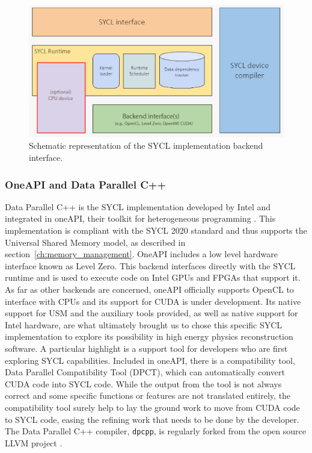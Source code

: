\begin{figure}[H]
    \centering
    \includegraphics[width=\textwidth]{media/ex_sycl_implementation.png}
    \caption{Schematic representation of the SYCL implementation backend interface.}
    \label{fig:sycl_implementations_backend}
\end{figure}

\subsubsection{OneAPI and Data Parallel C++}
Data Parallel C++ is the SYCL implementation developed by Intel and integrated in oneAPI, their toolkit for heterogeneous programming \cite{oneAPI}. This implementation is compliant with the SYCL 2020 standard and thus supports the Universal Shared Memory model, as described in section~\ref{ch:memory_management}. OneAPI includes a low level hardware interface known as Level Zero. This backend interfaces directly with the SYCL runtime and is used to execute code on Intel GPUs and FPGAs that support it. As far as other backends are concerned, oneAPI officially supports OpenCL to interface with CPUs and its support for CUDA is under development. Its native support for USM and the auxiliary tools provided, as well as native support for Intel hardware, are what ultimately brought us to chose this specific SYCL implementation to explore its possibility in high energy physics reconstruction software. A particular highlight is a support tool for developers who are first exploring SYCL capabilities. Included in oneAPI, there is a compatibility tool, Data Parallel Compatibility Tool (DPCT), which can automatically convert CUDA code into SYCL code. While the output from the tool is not always correct and some specific functions or features are not translated entirely, the compatibility tool surely help to lay the ground work to move from CUDA code to SYCL code, easing the refining work that needs to be done by the developer.
The Data Parallel C++ compiler, \Verb "dpcpp", is regularly forked from the open source LLVM project \cite{dpcpp}.

